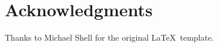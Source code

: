 














\section*{Acknowledgments}
Thanks to Michael Shell for the original \LaTeX\ template.

\ifCLASSOPTIONcaptionsoff
  \newpage
\fi







%

%





